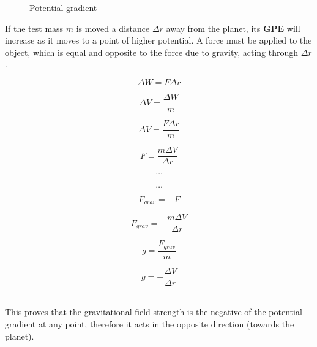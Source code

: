 \documentclass[10pt]{article}
\begin{document}
\begin{figure}[H]
\centering
{}
\caption{Potential gradient}
\label{img:potential_step}
\end{figure}

If the test mass \(m\) is moved a distance \(\Delta r\) away from the planet, its \textbf{GPE} will increase as it moves to a point of higher potential. A force must be applied to the object, which is equal and opposite to the force due to gravity, acting through \(\Delta r\).

\begin{figure}[H]
\vspace{5mm}
\centering
\begin{minipage}{.8\textwidth}
\begin{tcolorbox}[
sharp corners=all,
colback=white,
colframe=white,
size=tight,
boxrule=0.2mm,
left=10mm, right=10mm
]
\begin{multicols}{2}
\noindent
\[\Delta W = F \Delta r\]

\[\Delta V = \dfrac{\Delta W}{m}\]

\[\Delta V = \dfrac{F \Delta r}{m}\]

\[F = \dfrac{m \Delta V}{\Delta r}\]

\[\textbf{\ldots}\]
\columnbreak
\\
\[\textbf{\ldots}\]

\[F_{grav} = -F\]

\[F_{grav} = - \dfrac{m \Delta V}{\Delta r}\]

\[g = \dfrac{F_{grav}}{m}\]

\[g = - \dfrac{\Delta V}{\Delta r}\]
\\

\end{multicols}
\end{tcolorbox}
\end{minipage}
\end{figure}
This proves that the gravitational field strength is the negative of the potential gradient at any point, therefore it acts in the opposite direction (towards the planet).
\end{document}

